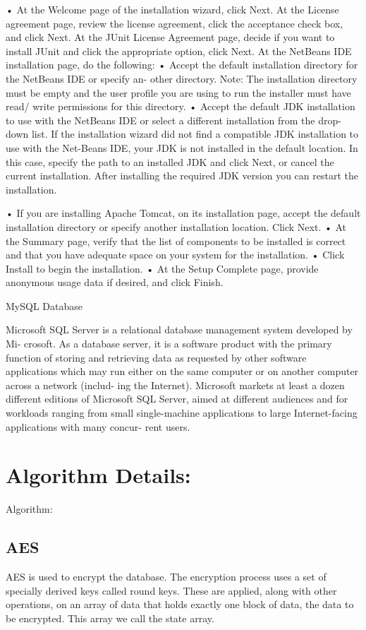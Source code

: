 \documentclass[oneside,a4paper,12pt]{report}
\begin{document}
{•	At the Welcome page of the installation wizard, click Next. At the License agreement page, review the license agreement, click the acceptance check box, and click Next. At the JUnit License Agreement page, decide if you want to install JUnit and click the appropriate option, click Next. At the NetBeans IDE installation page, do the following:
•	Accept the default installation directory for the NetBeans IDE or specify an- other directory. Note: The installation directory must be empty and the user profile you are using to run the installer must have read/ write permissions for this directory.
•	Accept the default JDK installation to use with the NetBeans IDE or select   a different installation from the drop-down list. If the installation wizard did not find a compatible JDK installation to use with the Net-Beans IDE, your JDK is not installed in the default location. In this case, specify the path to an installed JDK and click Next, or cancel the current installation. After installing the required JDK version you can restart the installation.

•	If you are installing Apache Tomcat, on its installation page, accept the default installation directory or specify another installation location. Click Next.
•	At the Summary page, verify that the list of components to be installed is correct and that you have adequate space on your system for the installation.
•	Click Install to begin the installation.
•	At the Setup Complete page, provide anonymous usage data if desired, and click Finish.

MySQL Database

Microsoft SQL Server is a relational database management system developed by Mi- crosoft. As a database server, it is a software product with the primary function of storing and retrieving data as requested by other software applications which may run either on the same computer or on another computer across a network (includ- ing the Internet). Microsoft markets at least a dozen different editions of Microsoft SQL Server, aimed at different audiences and for workloads ranging from small single-machine applications to large Internet-facing applications with many concur- rent users.

\newpage
\section{Algorithm Details:}
Algorithm:

\subsection{AES}
AES is used to encrypt the database.\newline
The encryption process uses a set of specially derived keys called round keys. 
These are applied, along with other operations, on an array of data that holds exactly one block of data, the data to be encrypted. 
This array we call the state array.\newline


}
\end{document}
